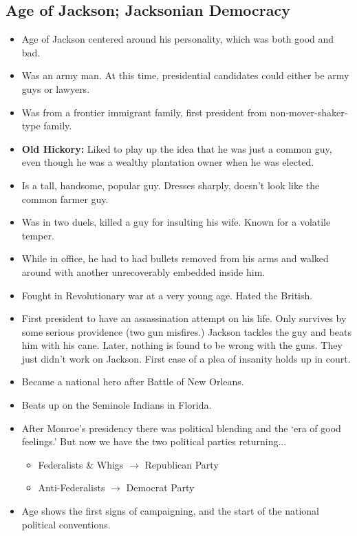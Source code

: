 \documentclass{article}
\begin{document}
    \subsection{Age of Jackson; Jacksonian Democracy}
      \begin{itemize}
        \item Age of Jackson centered around his personality, which was both good and bad.
        \item Was an army man. At this time, presidential candidates could either be army guys or lawyers.
        \item Was from a frontier immigrant family, first president from non-mover-shaker-type family.
        \item \textbf{Old Hickory:} Liked to play up the idea that he was just a common guy, even though he was a wealthy plantation owner when he was elected.
        \item Is a tall, handsome, popular guy. Dresses sharply, doesn't look like the common farmer guy.
        \item Was in two duels, killed a guy for insulting his wife. Known for a volatile temper.
        \item While in office, he had to had bullets removed from his arms and walked around with another unrecoverably embedded inside him.
        \item Fought in Revolutionary war at a very young age. Hated the British.
        \item First president to have an assassination attempt on his life. Only survives by some serious providence (two gun misfires.) Jackson tackles the guy and beats him with his cane. Later, nothing is found to be wrong with the guns. They just didn't work on Jackson. First case of a plea of insanity holds up in court.
        \item Became a national hero after Battle of New Orleans.
        \item Beats up on the Seminole Indians in Florida.
        \item After Monroe's presidency there was political blending and the `era of good feelings.' But now we have the two political parties returning...
          \begin{itemize}
            \item Federalists \& Whigs $\rightarrow$ Republican Party
            \item Anti-Federalists $\rightarrow$ Democrat Party
          \end{itemize}
        \item Age shows the first signs of campaigning, and the start of the national political conventions.

\end{itemize}
\end{document}
